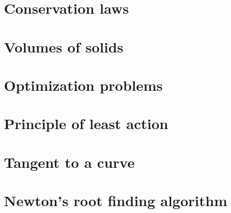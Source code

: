 \section{Conservation laws}

\section{Volumes of solids}

\section{Optimization problems}

\section{Principle of least action}

\section{Tangent to a curve}

\section{Newton's root finding algorithm}
